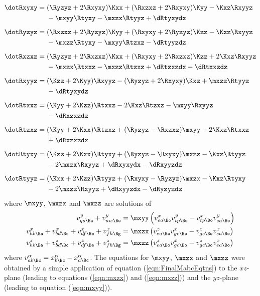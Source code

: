 \documentclass[a4paper,12pt]{article}
\numberwithin{equation}{section}
\begin{document}
\begin{align}
   \label{eqn:DotBrillRxyxy}
   \dotRxyxy ={}
   &
     (\Ryzyz+2\Rxyxy) \Kxx
   + (\Rxzxz+2\Rxyxy) \Kyy
   - \Kxz \Rxyyz
   \notag\\
   &
   - \mxyy \Rtyxy
   - \mxzx \Rtyyz
   + \dRtyxydx
   \\[5pt]
%
   \label{eqn:DotBrillRyzyz}
   \dotRyzyz ={}
   &
     (\Rxzxz+2\Ryzyz) \Kyy
   + (\Rxyxy+2\Ryzyz) \Kzz
   - \Kxz \Rxyyz
   \notag\\
   &
   - \mxzz \Rtyxy
   - \mxyy \Rtzxz
   - \dRtyyzdz
   \\[5pt]
%
   \label{eqn:DotBrillRxzxz}
   \dotRxzxz ={}
   &
     (\Ryzyz+2\Rxzxz) \Kxx
   + (\Rxyxy+2\Rxzxz) \Kzz
   + 2\Kxz \Rxyyz
   \notag\\
   &
   - \mxzx \Rtxxz
   - \mxzz \Rtzxz
   + \dRtzxzdx
   - \dRtxxzdz
   \\[5pt]
%
   \label{eqn:DotBrillRxyyz}
   \dotRxyyz ={}
   &
     (\Kzz + 2\Kyy) \Rxyyz
   - (\Ryzyz+2\Rxyxy) \Kxz
   + \mxzz \Rtyyz
   \notag\\
   &
   - \dRtyxydz
   \\[5pt]
%
   \label{eqn:DotBrillRtxxz}
   \dotRtxxz ={}
   &
     (\Kyy + 2\Kzz) \Rtxxz
   - 2\Kxz \Rtzxz
   - \mxyy \Rxyyz
   \notag\\
   &
   - \dRxzxzdz
   \\[5pt]
%
   \label{eqn:DotBrillRtzxz}
   \dotRtzxz ={}
   &
     (\Kyy + 2\Kxx) \Rtzxz
   + (\Ryzyz - \Rxzxz) \mxyy
   - 2\Kxz \Rtxxz
   \notag\\
   &
   + \dRxzxzdx
   \\[5pt]
%
   \label{eqn:DotBrillRtyxy}
   \dotRtyxy ={}
   &
     (\Kzz + 2\Kxx) \Rtyxy
   + (\Ryzyz - \Rxyxy) \mxzz
   - \Kxz \Rtyyz
   \notag\\
   &
   - 2\mxzx\Rxyyz
   + \dRxyxydx
   - \dRxyyzdz
   \\[5pt]
%
   \label{eqn:DotBrillRtyyz}
   \dotRtyyz ={}
   &
     (\Kxx + 2\Kzz) \Rtyyz
   + (\Rxyxy - \Ryzyz) \mxzx
   - \Kxz \Rtyxy
   \notag\\
   &
   - 2\mxzz\Rxyyz
   + \dRxyyzdx
   - \dRyzyzdz
\end{align}
where $\mxyy$, $\mxzx$ and $\mxzz$ are solutions of
\begin{align}
   \label{eqn:mxyy}
      v^y_{qs\Ba} + v^y_{uw\Be}
      &=
      \mxyy \left(v^x_{ea\Bo} v^y_{tp\Bo}-v^x_{tp\Bo} v^y_{ea\Bo}\right)\\
   \label{eqn:mxzx}
      v^x_{hb\Ba} + v^x_{bd\Bc} + v^x_{df\Be} + v^x_{fh\Bg}
      &=
      \mxzx \left(v^z_{ea\Bo} v^x_{gc\Bo}-v^z_{gc\Bo} v^x_{ea\Bo}\right)\\
   \label{eqn:mxzz}
      v^z_{hb\Ba} + v^z_{bd\Bc} + v^z_{df\Be} + v^z_{fh\Bg}
      &=
      \mxzz \left(v^z_{ea\Bo} v^x_{gc\Bo}-v^z_{gc\Bo} v^x_{ea\Bo}\right)
\end{align}
where $v^\alpha_{ab\Bc} = x^\alpha_{b\Bc}-x^\alpha_{a\Bc}$. The equations for $\mxyy$,
$\mxzx$ and $\mxzz$ were obtained by a simple application of equation
(\ref{eqn:FinalMabcEqtns}) to the $xz$-plane (leading to equations (\ref{eqn:mxzx}) and
(\ref{eqn:mxzz})) and the $yz$-plane (leading to equation (\ref{eqn:mxyy})).
\end{document}
